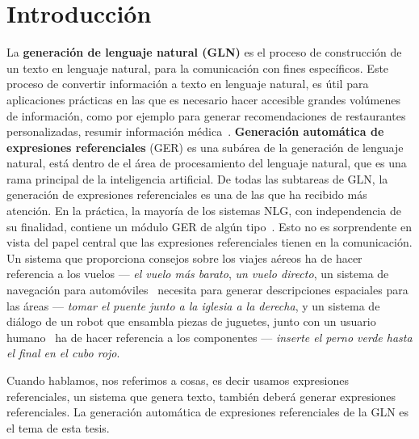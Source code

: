 \chapter{Introducci\'on}
\label{sec:intro}



La {\bf generaci\'on de lenguaje natural (GLN)} es el proceso de construcci\'on de un texto en lenguaje natural, para la comunicaci\'on con fines espec\'ificos. Este proceso de convertir informaci\'on a texto en lenguaje natural, es \'util para aplicaciones pr\'acticas en las que es necesario hacer accesible grandes vol\'umenes de informaci\'on, como por ejemplo para generar recomendaciones de restaurantes personalizadas, resumir informaci\'on m\'edica~\cite{dale2000}. {\bf Generaci\'on autom\'atica de expresiones referenciales} (GER) es una sub\'area de la generaci\'on de lenguaje natural, est\'a dentro de el \'area de procesamiento del lenguaje natural, que es una rama principal de la inteligencia artificial. 
De todas las subtareas de GLN, la generaci\'on de expresiones referenciales es
una de las que ha recibido m\'as atenci\'on. En la pr\'actica, la mayor\'ia de los
sistemas NLG, con independencia de su finalidad, contiene un m\'odulo GER de alg\'un tipo~\cite{Mellish2004}. Esto no es sorprendente
en vista del papel central que las expresiones referenciales tienen en la comunicaci\'on. Un sistema que proporciona
consejos sobre los viajes a\'ereos \cite{white2010generating} ha de hacer referencia a los vuelos --- {\it el
vuelo m\'as barato}, {\it un vuelo directo}, un sistema de navegaci\'on para autom\'oviles~\cite{Drager:2012:GLN:2380816.2380908}
necesita para generar descripciones espaciales para las \'areas --- {\it tomar el puente junto a la iglesia a la derecha},
y un sistema de di\'alogo de un robot que ensambla piezas de juguetes, junto con un usuario humano~\cite{foster-etal-ijcai2009} ha de hacer referencia a los componentes --- {\it inserte el perno verde hasta el final en el cubo rojo}.

Cuando hablamos, nos referimos a cosas, es decir usamos expresiones referenciales, un sistema que genera texto, tambi\'en deber\'a generar expresiones referenciales. La generaci\'on autom\'atica de expresiones referenciales de la GLN es el tema de esta tesis.

